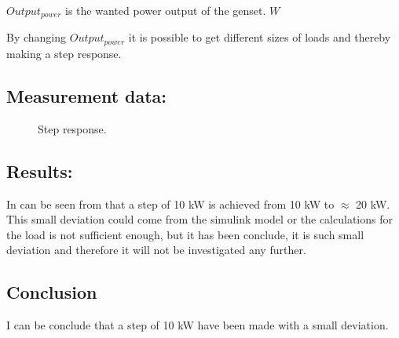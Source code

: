$Output_{power}$ is the wanted power output of the genset. $\unit{W}$

By changing $Output_{power}$ it is possible to get different sizes of loads and thereby making a step response. 

\subsection*{Measurement data:}
\begin{figure}[H]
\centering

\caption{Step response.}
\label{fig:stepresponse_power_10_20kW}
\end{figure}
\subsection*{Results:}
In can be seen from  that a step of 10 kW is achieved from 10 kW to $\approx$ 20 kW. This small deviation could come from the simulink model or the calculations for the load is not sufficient enough, but it has been conclude, it is such small deviation and therefore it will not be investigated any further. 

\subsection*{Conclusion}
I can be conclude that a step of 10 kW have been made with a small deviation. 